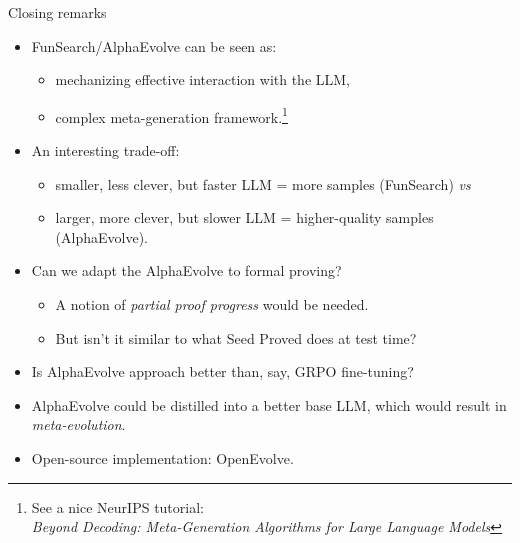 \documentclass{beamer}
\begin{document}
\begin{frame}{Closing remarks}
\begin{itemize}
\item FunSearch/AlphaEvolve can be seen as:
\begin{itemize}
\item mechanizing effective interaction with the LLM,
\item complex meta-generation framework.\footnote{See a nice NeurIPS tutorial:\\
\textit{Beyond Decoding: Meta-Generation Algorithms for Large Language Models}}
\end{itemize}
\item An interesting trade-off:
\begin{itemize}
\item smaller, less clever, but faster LLM = more samples (FunSearch) \textit{vs}
\item larger, more clever, but slower LLM = higher-quality samples (AlphaEvolve).
\end{itemize}
\item Can we adapt the AlphaEvolve to formal proving?
    \begin{itemize}
    \item A notion of \textit{partial proof progress} would be needed.
    \item But isn't it similar to what Seed Proved does at test time?
    \end{itemize}
\item Is AlphaEvolve approach better than, say, GRPO fine-tuning?
\item AlphaEvolve could be distilled into a better base LLM, which would result
in \textit{meta-evolution}.
\item Open-source implementation: OpenEvolve.
\end{itemize}
\end{frame}
\end{document}

